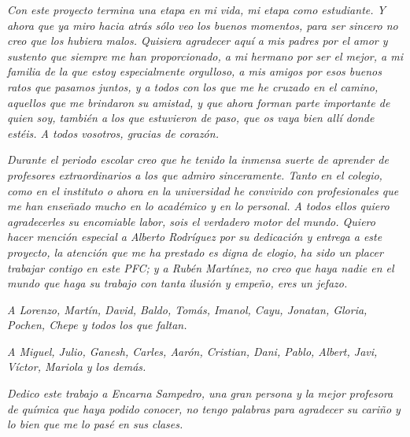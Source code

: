 
\begin{flushright}
    \begin{minipage}{.85\textwidth}
	\begin{flushright}
	    {\em Con este proyecto termina una etapa en mi vida, mi etapa
	    como estudiante. Y ahora que ya miro hacia atrás sólo veo los
	    buenos momentos, para ser sincero no creo que los hubiera
	    malos. Quisiera agradecer aquí a mis padres por el amor y
	    sustento que siempre me han proporcionado, a mi hermano por ser
	    el mejor, a mi familia de la que estoy especialmente orgulloso,
	    a mis amigos por esos buenos ratos que pasamos juntos, y a
	    todos con los que me he cruzado en el camino, aquellos que me
	    brindaron su amistad, y que ahora forman parte importante de
	    quien soy, también a los que estuvieron de paso, que os vaya
	    bien allí donde estéis. A todos vosotros, gracias de
	    corazón.}\medskip

	    {\em Durante el periodo escolar creo que he tenido la inmensa
	    suerte de aprender de profesores extraordinarios a los que
	    admiro sinceramente. Tanto en el colegio, como en el instituto
	    o ahora en la universidad he convivido con profesionales que me
	    han enseñado mucho en lo académico y en lo personal. A todos
	    ellos quiero agradecerles su encomiable labor, sois el
	    verdadero motor del mundo. Quiero hacer mención especial a
	    Alberto Rodríguez por su dedicación y entrega a este proyecto,
	    la atención que me ha prestado es digna de elogio, ha sido un
	    placer trabajar contigo en este PFC; y a Rubén Martínez, no
	    creo que haya nadie en el mundo que haga su trabajo con tanta
	    ilusión y empeño, eres un jefazo.}\medskip

	    {\em A Lorenzo, Martín, David, Baldo, Tomás, Imanol, Cayu,
	    Jonatan, Gloria, Pochen, Chepe y todos los que faltan.}\medskip

	    {\em A Miguel, Julio, Ganesh, Carles, Aarón, Cristian, Dani,
	    Pablo, Albert, Javi, Víctor, Mariola y los demás.}
	    \vspace{8\medskipamount}

	    {\em Dedico este trabajo a Encarna Sampedro, una gran persona y
	    la mejor profesora de química que haya podido conocer, no tengo
	    palabras para agradecer su cariño y lo bien que me lo pasé en
	    sus clases.}
	\end{flushright}
    \end{minipage}
\end{flushright}


\cleardoublepage
